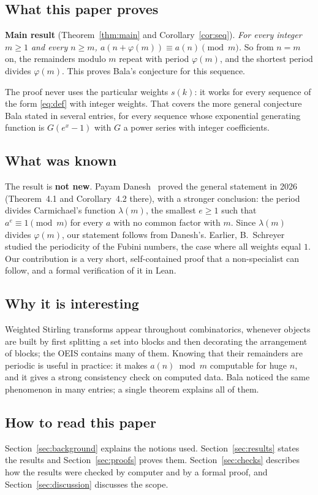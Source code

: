 \documentclass[11pt,a4paper]{article}
\theoremstyle{definition}
\theoremstyle{remark}
\begin{document}
\subsection{What this paper proves}
\textbf{Main result} (Theorem~\ref{thm:main} and Corollary~\ref{cor:seq}). \emph{For every integer $m\ge1$ and every
$n\ge m$, $a(n+\varphi(m))\equiv a(n)\pmod m$.} So from $n=m$ on, the remainders modulo $m$ repeat with period
$\varphi(m)$, and the shortest period divides $\varphi(m)$. This proves Bala's conjecture for this sequence.

The proof never uses the particular weights $s(k)$: it works for every sequence of the form \eqref{eq:def} with
integer weights. That covers the more general conjecture Bala stated in several entries, for every sequence whose
exponential generating function is $G(e^x-1)$ with $G$ a power series with integer coefficients.

\subsection{What was known}
The result is \textbf{not new}. Payam Danesh~\cite{danesh} proved the general statement in 2026 (Theorem~4.1 and
Corollary~4.2 there), with a stronger conclusion: the period divides Carmichael's function $\lambda(m)$, the smallest
$e\ge1$ such that $a^e\equiv1\pmod m$ for every $a$ with no common factor with $m$. Since $\lambda(m)$ divides
$\varphi(m)$, our statement follows from Danesh's. Earlier, B.~Schreyer~\cite{schreyer} studied the periodicity of the
Fubini numbers, the case where all weights equal $1$. Our contribution is a very short, self-contained proof that a
non-specialist can follow, and a formal verification of it in Lean.

\subsection{Why it is interesting}
Weighted Stirling transforms appear throughout combinatorics, whenever objects are built by first splitting a set into
blocks and then decorating the arrangement of blocks; the OEIS contains many of them. Knowing that their remainders are
periodic is useful in practice: it makes $a(n)\bmod m$ computable for huge $n$, and it gives a strong consistency check
on computed data. Bala noticed the same phenomenon in many entries; a single theorem explains all of them.

\subsection{How to read this paper}
Section~\ref{sec:background} explains the notions used. Section~\ref{sec:results} states the results and
Section~\ref{sec:proofs} proves them. Section~\ref{sec:checks} describes how the results were checked by computer and by a
formal proof, and Section~\ref{sec:discussion} discusses the scope.
\end{document}
